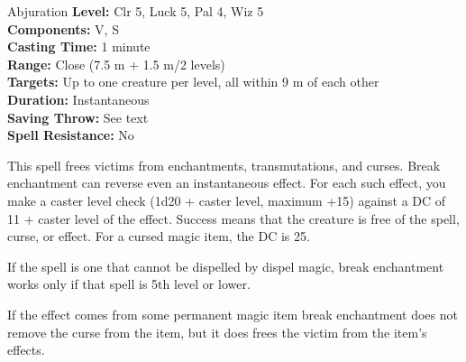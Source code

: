 {Abjuration}
{
	\textbf{Level:}
	Clr 5, Luck 5, Pal 4, Wiz 5\\
	\textbf{Components:}
	V, S\\
	\textbf{Casting Time:}
	1 minute\\
	\textbf{Range:}
	Close (7.5 m + 1.5 m/2 levels)\\
	\textbf{Targets:}
	Up to one creature per level, all within 9 m of each other\\
	\textbf{Duration:}
	Instantaneous\\
	\textbf{Saving Throw:}
	See text\\
	\textbf{Spell Resistance:}
	No\\
}
{
	This spell frees victims from enchantments, transmutations, and curses. Break enchantment can reverse even an instantaneous effect. For each such effect, you make a caster level check (1d20 + caster level, maximum +15) against a DC of 11 + caster level of the effect. Success means that the creature is free of the spell, curse, or effect. For a cursed magic item, the DC is 25.

	If the spell is one that cannot be dispelled by dispel magic, break enchantment works only if that spell is 5th level or lower.

	If the effect comes from some permanent magic item break enchantment does not remove the curse from the item, but it does frees the victim from the item's effects.

}
